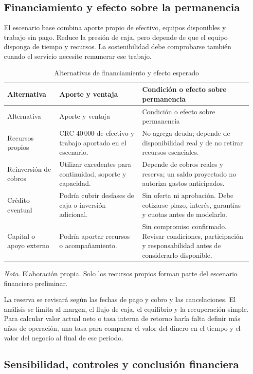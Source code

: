 \subsection{Financiamiento y efecto sobre la permanencia}

El escenario base combina aporte propio de efectivo, equipos disponibles y
trabajo sin pago. Reduce la presión de caja, pero depende de que el equipo
disponga de tiempo y recursos. La sostenibilidad debe comprobarse también
cuando el servicio necesite remunerar ese trabajo.

\begin{longtable}{p{3cm}p{4.8cm}p{6.2cm}}
\caption{Alternativas de financiamiento y efecto esperado}\\
\toprule Alternativa & Aporte y ventaja & Condición o efecto sobre permanencia \\
\midrule\endfirsthead
\toprule Alternativa & Aporte y ventaja & Condición o efecto sobre permanencia \\
\midrule\endhead
Recursos propios & CRC 40\,000 de efectivo y trabajo aportado en el escenario. & No agrega deuda; depende de disponibilidad real y de no retirar recursos esenciales. \\
Reinversión de cobros & Utilizar excedentes para continuidad, soporte y capacidad. & Depende de cobros reales y reserva; un saldo proyectado no autoriza gastos anticipados. \\
Crédito eventual & Podría cubrir desfases de caja o inversión adicional. & Sin oferta ni aprobación. Debe cotizarse plazo, interés, garantías y cuotas antes de modelarlo. \\
Capital o apoyo externo & Podría aportar recursos o acompañamiento. & Sin compromiso confirmado. Revisar condiciones, participación y responsabilidad antes de considerarlo disponible. \\
\bottomrule
\end{longtable}
{\small\textit{Nota}. Elaboración propia. Solo los recursos propios forman
parte del escenario financiero preliminar.}

La reserva se revisará según las fechas de pago y cobro y las cancelaciones.
El análisis se limita al margen, el flujo de caja, el equilibrio y la
recuperación simple. Para calcular valor actual neto o tasa interna de retorno
haría falta definir más años de operación, una tasa para comparar el valor del
dinero en el tiempo y el valor del negocio al final de ese periodo.

\subsection{Sensibilidad, controles y conclusión financiera}

